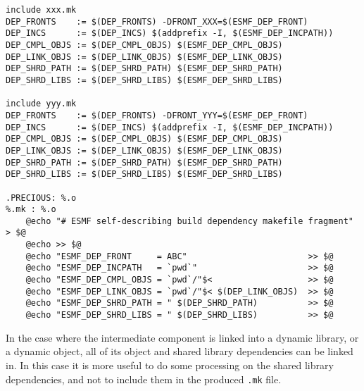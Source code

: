 \begin{verbatim}
include xxx.mk
DEP_FRONTS    := $(DEP_FRONTS) -DFRONT_XXX=$(ESMF_DEP_FRONT)
DEP_INCS      := $(DEP_INCS) $(addprefix -I, $(ESMF_DEP_INCPATH))
DEP_CMPL_OBJS := $(DEP_CMPL_OBJS) $(ESMF_DEP_CMPL_OBJS)
DEP_LINK_OBJS := $(DEP_LINK_OBJS) $(ESMF_DEP_LINK_OBJS)
DEP_SHRD_PATH := $(DEP_SHRD_PATH) $(ESMF_DEP_SHRD_PATH)
DEP_SHRD_LIBS := $(DEP_SHRD_LIBS) $(ESMF_DEP_SHRD_LIBS)

include yyy.mk
DEP_FRONTS    := $(DEP_FRONTS) -DFRONT_YYY=$(ESMF_DEP_FRONT)
DEP_INCS      := $(DEP_INCS) $(addprefix -I, $(ESMF_DEP_INCPATH))
DEP_CMPL_OBJS := $(DEP_CMPL_OBJS) $(ESMF_DEP_CMPL_OBJS)
DEP_LINK_OBJS := $(DEP_LINK_OBJS) $(ESMF_DEP_LINK_OBJS)
DEP_SHRD_PATH := $(DEP_SHRD_PATH) $(ESMF_DEP_SHRD_PATH)
DEP_SHRD_LIBS := $(DEP_SHRD_LIBS) $(ESMF_DEP_SHRD_LIBS)

.PRECIOUS: %.o
%.mk : %.o
	@echo "# ESMF self-describing build dependency makefile fragment" > $@
	@echo >> $@
	@echo "ESMF_DEP_FRONT     = ABC"                        >> $@
	@echo "ESMF_DEP_INCPATH   = `pwd`"                      >> $@
	@echo "ESMF_DEP_CMPL_OBJS = `pwd`/"$<                   >> $@
	@echo "ESMF_DEP_LINK_OBJS = `pwd`/"$< $(DEP_LINK_OBJS)  >> $@
	@echo "ESMF_DEP_SHRD_PATH = " $(DEP_SHRD_PATH)          >> $@
	@echo "ESMF_DEP_SHRD_LIBS = " $(DEP_SHRD_LIBS)          >> $@
\end{verbatim}

In the case where the intermediate component is linked into a dynamic library, or a dynamic object, all of its object and shared library dependencies can be linked in. In this case it is more useful to do some processing on the shared library dependencies, and not to include them in the produced {\tt .mk} file.

